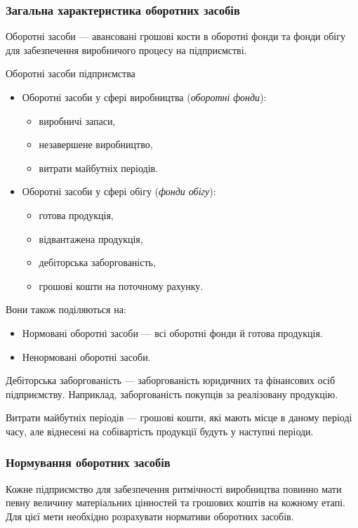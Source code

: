 \documentclass[a4paper,10pt,notitlepage,pdftex,headsepline]{scrartcl}
\begin{document}
    \subsubsection{Загальна характеристика оборотних засобів}
      Оборотні засоби --- авансовані грошові кости в оборотні фонди та фонди
      обігу для забезпечення виробничого процесу на підприємстві.

      Оборотні засоби підприємства
      \begin{itemize}
        \item Оборотні засоби у сфері виробництва (\emph{оборотні фонди}):
          \begin{itemize}
            \item виробничі запаси,
            \item незавершене виробництво,
            \item витрати майбутніх періодів.
          \end{itemize}
        \item Оборотні засоби у сфері обігу (\emph{фонди обігу}):
          \begin{itemize}
            \item готова продукція,
            \item відвантажена продукція,
            \item дебіторська заборгованість,
            \item грошові кошти на поточному рахунку.
          \end{itemize}
      \end{itemize}

      Вони також поділяються на:
      \begin{itemize}
        \item Нормовані оборотні засоби --- всі оборотні фонди й готова
          продукція.
        \item Ненормовані оборотні засоби.
      \end{itemize}

      Дебіторська заборгованість --- заборгованість юридичних та фінансових
      осіб підприємству.
      Наприклад, заборгованість покупців за реалізовану продукцію.


      Витрати майбутніх періодів --- грошові кошти, які мають місце в даному
      періоді часу, але віднесені на собівартість продукції будуть у наступні
      періоди.

    \subsubsection{Нормування оборотних засобів}
      Кожне підприємство для забезпечення ритмічності виробництва повинно мати
      певну величину матеріальних цінностей та грошових коштів на кожному
      етапі.
      Для цієї мети необхідно розрахувати нормативи оборотних засобів.
\end{document}
